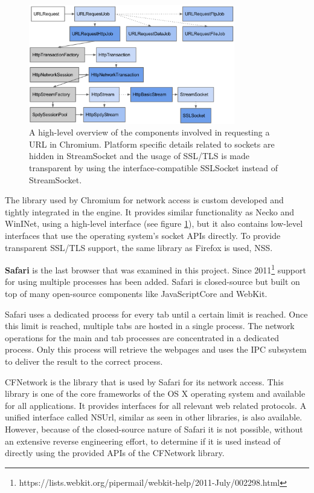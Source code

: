 \begin{figure}[h]
    \centering
    \includegraphics[width=9cm]{Images/Chrome_network.png}
    \caption{A high-level overview of the components involved in requesting a URL in Chromium. Platform specific details related to sockets are hidden in StreamSocket and the usage of SSL/TLS is made transparent by using the interface-compatible SSLSocket instead of StreamSocket. \cite{ChromeNetwork}}
    \label{fig:chrome_network}
\end{figure}

The library used by Chromium for network access is custom developed and tightly integrated in the engine. It provides similar functionality as Necko and WinINet, using a high-level interface (see figure \ref{fig:chrome_network}), but it also contains low-level interfaces that use the operating system's socket APIs directly. To provide transparent SSL/TLS support, the same library as Firefox is used, NSS.

\textbf{Safari} is the last browser that was examined in this project. Since 2011\footnote{https://lists.webkit.org/pipermail/webkit-help/2011-July/002298.html} support for using multiple processes has been added. Safari is closed-source but built on top of many open-source components like JavaScriptCore and WebKit.

Safari uses a dedicated process for every tab until a certain limit is reached. Once this limit is reached, multiple tabs are hosted in a single process. The network operations for the main and tab processes are concentrated in a dedicated process. Only this process will retrieve the webpages and uses the IPC subsystem to deliver the result to the correct process. 

CFNetwork is the library that is used by Safari for its network access. This library is one of the core frameworks of the OS X operating system and available for all applications. It provides interfaces for all relevant web related protocols. A unified interface called NSUrl, similar as seen in other libraries, is also available. However, because of the closed-source nature of Safari it is not possible, without an extensive reverse engineering effort, to determine if it is used instead of directly using the provided APIs of the CFNetwork library.

